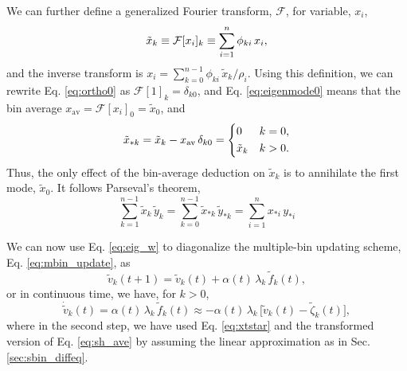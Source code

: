\documentclass[reprint, superscriptaddress, floatfix]{revtex4-1}
\newcommand{\bav}[1]{#1_\mathrm{av}}
\begin{document}
We can further define
a generalized Fourier transform, $\mathcal{F}$,
for variable, $x_i$,
%
\begin{equation}
  {\tilde x}_k
  \equiv \mathcal{F}[x_i]_k
  \equiv \sum_{i = 1}^n \phi_{ki} \, x_i
  ,
  \notag
\end{equation}
%
and the inverse transform is
$x_i = \sum_{k = 0}^{n-1} \phi_{ki} \, \tilde{x}_k / \rho_i$.
%
%
Using this definition,
we can rewrite Eq. \eqref{eq:ortho0} as
$\mathcal F[1]_k = \delta_{k0}$,
%
and Eq. \eqref{eq:eigenmode0} means that
the bin average
$\bav{x}= \mathcal F[x_i]_0 = \tilde x_0$,
%
and
\begin{equation}
  \tilde x_{*k}
  = \tilde x_k - \bav{x} \, \delta_{k0}
  =
  \begin{dcases}
    0           & k = 0
    ,
    \\
    \tilde x_k  & k > 0
    .
  \end{dcases}
  \label{eq:xtstar}
\end{equation}
%
Thus, the only effect
of the bin-average deduction on $\tilde x_k$ is to
annihilate the first mode, $\tilde x_0$.
%
It follows Parseval's theorem,
\begin{equation}
  \sum_{k=1}^{n-1} \tilde x_k \, \tilde y_k
  =
  \sum_{k=0}^{n-1} \tilde x_{*k} \, \tilde y_{*k}
  =
  \sum_{i=1}^n x_{*i} \, y_{*i}
  \label{eq:parseval}
\end{equation}

We can now use Eq. \eqref{eq:eig_w} to diagonalize
the multiple-bin updating scheme, Eq. \eqref{eq:mbin_update},
as
%
\begin{equation}
  {\tilde v}_k(t + 1) =
  {\tilde v}_k(t) + \alpha(t) \, \lambda_k \,
  {\tilde f}_k(t)
  ,
  \label{eq:vkupdate}
\end{equation}
%
or in continuous time, we have, for $k > 0$,
%
\begin{equation}
  \dot{\tilde v}_k(t)
  =
  \alpha(t) \, \lambda_k \, {\tilde f}_k(t)
  \approx
  -\alpha(t) \, \lambda_k \,
  \bigl[ {\tilde v}_k(t) - {\tilde \zeta}_k(t) \bigr]
  ,
  \label{eq:vt_diffeq_mbin}
\end{equation}
%
where in the second step,
we have used Eq. \eqref{eq:xtstar} and
the transformed version of Eq. \eqref{eq:sh_ave}
by assuming the linear approximation
as in Sec. \ref{sec:sbin_diffeq}.
\end{document}

